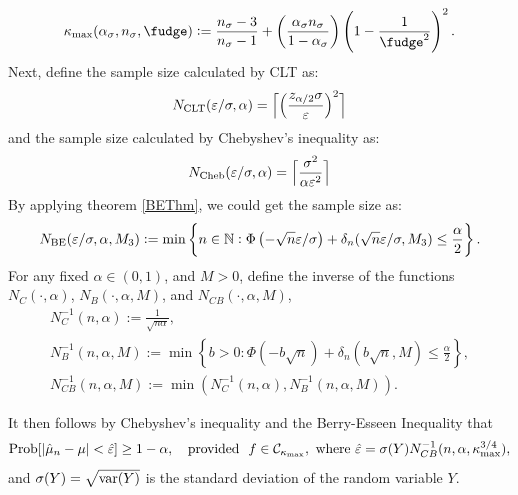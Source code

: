 \documentclass{iitthesis}
\begin{document}
\begin{equation}
\label{kappamaxdef}
\kappa_{\max} (\alpha_\sigma, n_{\sigma},\fudge):= \frac{n_{\sigma}-3}{n_{\sigma}-1} + \left(\frac{ \alpha_\sigma n_{\sigma}}{1-\alpha_\sigma}\right) \left(1 - \frac{1}{\fudge^2}\right)^2.
\end{equation}
Next, define the sample size calculated by CLT as:
\begin{equation}\label{NCLT}
N_{\mathrm{CLT}}(\varepsilon/\sigma,\alpha)
= 
\Bigl\lceil
\Bigl(
\frac{z_{\alpha/2}\sigma}{\varepsilon}
\Bigr)^2
\Bigr\rceil
\end{equation}
and the sample size calculated by Chebyshev's inequality as:
\begin{equation}\label{NCheby}
N_{\text{Cheb}}(\varepsilon/\sigma,\alpha)
= 
\Bigl\lceil\frac{\sigma^2}{\alpha\varepsilon^2}\Bigr\rceil
\end{equation}
By applying theorem \ref{BEThm}, we could get the sample size as:
\begin{equation}\label{NBE}
N_{\text{BE}}(\varepsilon/\sigma,\alpha,M_3) := \min \left \{ n \in \mathbb{N} : \Phi\left(-\sqrt{n}\varepsilon/\sigma  \right)+\delta_n(\sqrt{n}\varepsilon/\sigma,M_3)
\le \frac{\alpha}{2} \right \}.
\end{equation}
For any fixed $\alpha \in (0,1)$, and $M>0$, define the inverse of the functions $N_C(\cdot,\alpha)$, $N_B(\cdot,\alpha,M)$, and $N_{CB}(\cdot,\alpha,M)$,
\begin{gather*}\label{NCinv}
N_C^{-1}(n,\alpha) := \frac{1}{\sqrt{n \alpha}}, \\
\label{NBinv*}
N_B^{-1}(n,\alpha,M) := \min \left \{ b>0 : \Phi\left(-b \sqrt{n}  \right)+\delta_n(b\sqrt{n},M)
\le \frac{\alpha}{2} \right \}, \\
\label{NCBinv*}
N_{CB}^{-1}(n,\alpha,M) := \min(N_C^{-1}(n,\alpha),N_B^{-1}(n,\alpha,M)).
\end{gather*}

It then follows by Chebyshev's inequality and the Berry-Esseen Inequality  that 
\begin{equation*}
\operatorname{Prob}[\left \lvert \hat{\mu}_n -\mu \right \rvert<\hat{\varepsilon}] \geq 1-\alpha, \quad \text{provided } \ f \in \mathcal{C}_{\kappa_{\max}}, \text{ where }\hat{\varepsilon}=\sigma(Y) N_{CB}^{-1}(n,\alpha,\kappa_{\max}^{3/4}), 
\end{equation*} 
and $\sigma(Y)=\sqrt{\operatorname{var}(Y)}$ is the standard deviation of the random variable $Y$.  
\end{document}
